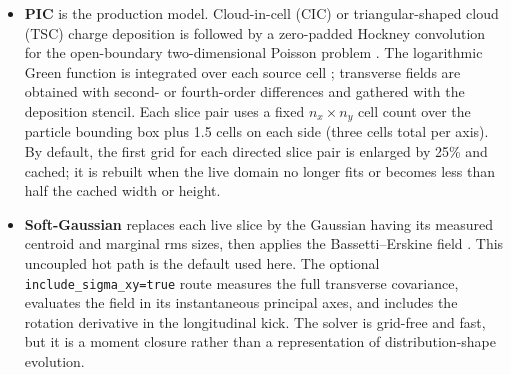 \documentclass[a4paper,fleqn]{cas-sc}
\newcommand{\code}[1]{\texttt{#1}}
\begin{document}
\begin{itemize}
\item \textbf{PIC} is the production model.  Cloud-in-cell (CIC) or
triangular-shaped cloud (TSC) charge deposition is
followed by a zero-padded Hockney convolution for the open-boundary
two-dimensional Poisson problem \citep{HockneyEastwood1988}.  The logarithmic
Green function is integrated over each source cell
\citep{QiangGreen2002,QiangIGF2006}; transverse fields are obtained with
second- or fourth-order differences and gathered with the deposition
stencil.  Each slice pair uses a fixed $n_x\times n_y$ cell count over the
particle bounding box plus 1.5 cells on each side (three cells total per
axis).  By default, the first grid for each directed slice pair is enlarged
by 25\% and cached; it is rebuilt when the live domain no longer fits or
becomes less than half the cached width or height.

\item \textbf{Soft-Gaussian} replaces each live slice by the Gaussian having
its measured centroid and marginal rms sizes, then applies the
Bassetti--Erskine field \citep{BassettiErskine1980}.  This uncoupled hot path
is the default used here.  The optional \code{include\_sigma\_xy=true} route
measures the full transverse covariance, evaluates the field in its
instantaneous principal axes, and includes the rotation derivative in the
longitudinal kick.  The solver is grid-free and fast, but it is a moment
closure rather than a representation of distribution-shape evolution.


\end{itemize}
\end{document}
